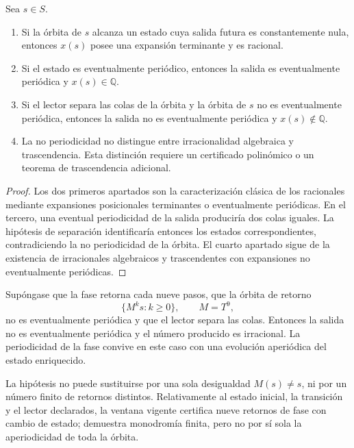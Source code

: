 \begin{theorem}
\label{thm:clasificacion-retorno-fase}
Sea \(s\in S\).
\begin{enumerate}
  \item Si la órbita de \(s\) alcanza un estado cuya salida futura es
  constantemente nula, entonces \(x(s)\) posee una expansión terminante y es
  racional.
  \item Si el estado es eventualmente periódico, entonces la salida es
  eventualmente periódica y \(x(s)\in\mathbb Q\).
  \item Si el lector separa las colas de la órbita y la órbita de \(s\) no es
  eventualmente periódica, entonces la salida no es eventualmente periódica
  y \(x(s)\notin\mathbb Q\).
  \item La no periodicidad no distingue entre irracionalidad algebraica y
  trascendencia. Esta distinción requiere un certificado polinómico o un
  teorema de trascendencia adicional.
\end{enumerate}
\end{theorem}

\begin{proof}
Los dos primeros apartados son la caracterización clásica de los racionales
mediante expansiones posicionales terminantes o eventualmente periódicas. En
el tercero, una eventual periodicidad de la salida produciría dos colas
iguales. La hipótesis de separación identificaría entonces los estados
correspondientes, contradiciendo la no periodicidad de la órbita. El cuarto
apartado sigue de la existencia de irracionales algebraicos y trascendentes
con expansiones no eventualmente periódicas.
\end{proof}

\begin{corollary}
Supóngase que la fase retorna cada nueve pasos, que la órbita de retorno
\[
 \{M^ks:k\geq0\},\qquad M=T^9,
\]
no es eventualmente periódica y que el lector separa las colas. Entonces la
salida no es eventualmente periódica y el número producido es irracional. La
periodicidad de la fase convive en este caso con una evolución aperiódica del
estado enriquecido.
\end{corollary}

La hipótesis no puede sustituirse por una sola desigualdad \(M(s)\ne s\), ni
por un número finito de retornos distintos. Relativamente al estado inicial,
la transición y el lector declarados, la ventana vigente certifica nueve
retornos de fase con cambio de estado; demuestra monodromía finita, pero no
por sí sola la aperiodicidad de toda la órbita.

